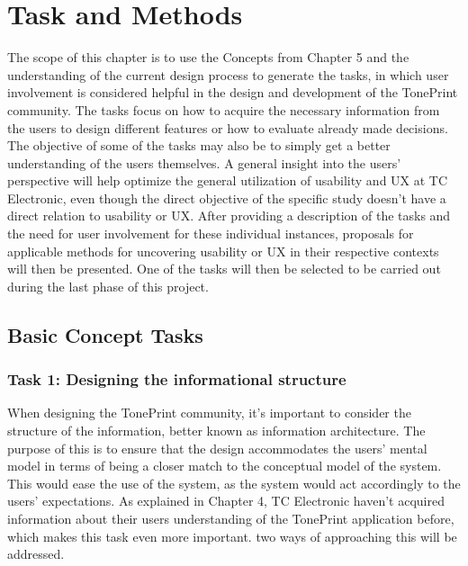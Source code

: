 \chapter{Task and Methods}
\label{TaskAndMethods}
\noindent
The scope of this chapter is to use the Concepts from Chapter 5 and the understanding of the current design process to generate the tasks, in which user involvement is considered helpful in the design and development of the TonePrint community. The tasks focus on how to acquire the necessary information from the users to design different features or how to evaluate already made decisions. The objective of some of the tasks may also be to simply get a better understanding of the users themselves. A general insight into the users' perspective will help optimize the general utilization of usability and UX at TC Electronic, even though the direct objective of the specific study doesn't have a direct relation to usability or UX. After providing a description of the tasks and the need for user involvement for these individual instances, proposals for applicable methods for uncovering usability or UX in their respective contexts will then be presented. One of the tasks will then be selected to be carried out during the last phase of this project.


\section{Basic Concept Tasks}
\label{BasicConceptTaks}

\subsection{Task 1: Designing the informational structure}
\label{Task1}
When designing the TonePrint community, it's important to consider the structure of the information, better known as information architecture. The purpose of this is to ensure that the design accommodates the users' mental model in terms of being a closer match to the conceptual model of the system. This would ease the use of the system, as the system would act accordingly to the users' expectations. As explained in Chapter 4, TC Electronic haven't acquired information about their users understanding of the TonePrint application before, which makes this task even more important. two ways of approaching this will be addressed. \\

